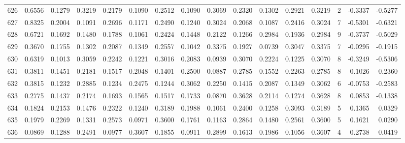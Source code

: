 \begin{tabular}{lrrrrrrrrrrrrrrr}
626 &      0.6556 &  0.1279 &  0.3219 &  0.2179 &  0.1090 &  0.2512 &  0.1090 &  0.3069 &  0.2320 &  0.1302 &   0.2921 &     0.3219 &      2 &                   -0.3337 &                    -0.5277 \\
627 &      0.8325 &  0.2004 &  0.1091 &  0.2696 &  0.1171 &  0.2490 &  0.1240 &  0.3024 &  0.2068 &  0.1087 &   0.2416 &     0.3024 &      7 &                   -0.5301 &                    -0.6321 \\
628 &      0.6721 &  0.1692 &  0.1480 &  0.1788 &  0.1061 &  0.2424 &  0.1448 &  0.2122 &  0.1266 &  0.2984 &   0.1936 &     0.2984 &      9 &                   -0.3737 &                    -0.5029 \\
629 &      0.3670 &  0.1755 &  0.1302 &  0.2087 &  0.1349 &  0.2557 &  0.1042 &  0.3375 &  0.1927 &  0.0739 &   0.3047 &     0.3375 &      7 &                   -0.0295 &                    -0.1915 \\
630 &      0.6319 &  0.1013 &  0.3059 &  0.2242 &  0.1221 &  0.3016 &  0.2083 &  0.0939 &  0.3070 &  0.2224 &   0.1225 &     0.3070 &      8 &                   -0.3249 &                    -0.5306 \\
631 &      0.3811 &  0.1451 &  0.2181 &  0.1517 &  0.2048 &  0.1401 &  0.2500 &  0.0887 &  0.2785 &  0.1552 &   0.2263 &     0.2785 &      8 &                   -0.1026 &                    -0.2360 \\
632 &      0.3815 &  0.1232 &  0.2885 &  0.1234 &  0.2475 &  0.1244 &  0.3062 &  0.2250 &  0.1415 &  0.2087 &   0.1349 &     0.3062 &      6 &                   -0.0753 &                    -0.2583 \\
633 &      0.2775 &  0.1437 &  0.2174 &  0.1693 &  0.1565 &  0.1517 &  0.1733 &  0.0870 &  0.3628 &  0.2114 &   0.1274 &     0.3628 &      8 &                    0.0853 &                    -0.1338 \\
634 &      0.1824 &  0.2153 &  0.1476 &  0.2322 &  0.1240 &  0.3189 &  0.1988 &  0.1061 &  0.2400 &  0.1258 &   0.3093 &     0.3189 &      5 &                    0.1365 &                     0.0329 \\
635 &      0.1979 &  0.2269 &  0.1331 &  0.2573 &  0.0971 &  0.3600 &  0.1761 &  0.1163 &  0.2864 &  0.1480 &   0.2561 &     0.3600 &      5 &                    0.1621 &                     0.0290 \\
636 &      0.0869 &  0.1288 &  0.2491 &  0.0977 &  0.3607 &  0.1855 &  0.0911 &  0.2899 &  0.1613 &  0.1986 &   0.1056 &     0.3607 &      4 &                    0.2738 &                     0.0419 \\

\end{tabular}

